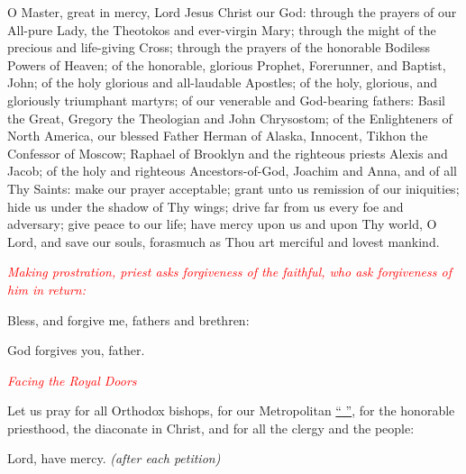 \documentclass[paper=a6,fontsize=2.3mm]{scrartcl}
\begin{document}
\hangindent=10mm
\noindent{}O Master, great in mercy, Lord Jesus Christ 
our God: through the prayers of our All-pure Lady, the Theotokos and 
ever-virgin Mary; through the might of the precious and life-giving Cross; 
through the prayers of the honorable Bodiless Powers of Heaven; of the 
honorable, glorious Prophet, Forerunner, and Baptist, John; of the holy 
glorious and all-laudable Apostles; of the holy, glorious, and gloriously 
triumphant martyrs; of our venerable and God-bearing fathers: Basil the Great, 
Gregory the Theologian and John Chrysostom; of the Enlighteners of North 
America, our blessed Father Herman of Alaska, Innocent, Tikhon the Confessor of 
Moscow; Raphael of Brooklyn and the righteous priests Alexis and Jacob; of the 
holy and righteous Ancestors-of-God, Joachim and Anna, and of all Thy Saints: 
make our prayer acceptable;  grant unto us remission of our iniquities;  hide 
us under the shadow of Thy wings;  drive far from us every foe and adversary;  
give peace to our life;  have mercy upon us and upon Thy world, O Lord, and 
save our souls, forasmuch as Thou art merciful and lovest mankind.

\noindent
\textcolor{red}{\textit{Making prostration, priest asks forgiveness of the faithful, who ask forgiveness of him in return:}}

\hangindent=10mm
\noindent{}Bless, and forgive me, fathers and brethren:

\hangindent=10mm
\noindent{}God forgives you, father.

\noindent
\textcolor{red}{\textit{Facing the Royal Doors}}

\hangindent=10mm
\noindent{}Let us pray for all Orthodox bishops, for 
our 
Metropolitan \underline{``          ''}, for the honorable priesthood, the 
diaconate in Christ, and for all the clergy and the people:

\hangindent=10mm
\noindent{}Lord, have mercy. \textit{(after each 
petition)}
\end{document}
